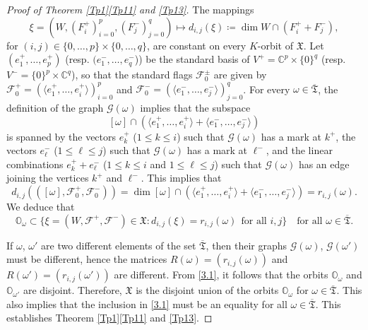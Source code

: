 \documentclass[11pt]{article}
\theoremstyle{definition}
\numberwithin{equation}{section}
\newcommand{\Span}[1]{\langle #1\rangle}
\newcommand{\flag}{\mathcal{F}}
\newcommand{\Xorbit}{\mathbb{O}}
\newcommand{\ppermutationsof}{\mathfrak{T}}
\newcommand{\parameters}{\overline{\ppermutationsof}}
\newcommand{\Xfv}{\mathfrak{X}}
\newcommand{\mC}{\mathbb{C}}
\begin{document}
\begin{proof}[Proof of Theorem \ref{Tp1}\ref{Tp11} and \ref{Tp13}]
The mappings
\[\xi=(W,(F^+_i)_{i=0}^p,(F^-_j)_{j=0}^q)\mapsto d_{i,j}(\xi)\coloneqq \dim W\cap (F_i^++F_j^-),\] for $(i,j)\in\{0,\ldots,p\}\times\{0,\ldots,q\}$, are constant on every $K$-orbit of $\Xfv$.
Let $(e_1^+,\ldots,e_p^+)$ (resp. $(e_1^-,\ldots,e_q^-$)) be the standard basis of $V^+=\mC^p\times\{0\}^q$ (resp. $V^-=\{0\}^p\times\mC^q$), so that the standard flags $\flag_0^\pm$ are given by $\flag_0^+=(\Span{e_1^+,\ldots,e_i^+})_{i=0}^p$ and $\flag_0^-=(\Span{e_1^-,\ldots,e_j^-})_{j=0}^q$.
For every $\omega\in\parameters$,
the definition of the graph $\mathcal{G}(\omega)$ implies that the subspace \[[\omega]\cap(\Span{e_1^+,\ldots,e_i^+}+\Span{e_1^-,\ldots,e_j^-})\]
is spanned by the vectors $e_k^+$ ($1\leq k\leq i$) such that $\mathcal{G}(\omega)$ has a mark at $k^+$, the vectors $e_\ell^-$ ($1\leq \ell\leq j$) such that $\mathcal{G}(\omega)$ has a mark at $\ell^-$, and the linear combinations $e_k^++e_\ell^-$ ($1\leq k\leq i$ and $1\leq \ell\leq j$) such that $\mathcal{G}(\omega)$ has an edge joining the vertices $k^+$ and $\ell^-$. This implies that
\[
d_{i,j}(([\omega],\flag_0^+,\flag_0^-))=\dim [\omega]\cap(\Span{e_1^+,\ldots,e_i^+}+\Span{e_1^-,\ldots,e_j^-})=r_{i,j}(\omega).
\]
We deduce that
\begin{equation}
\label{3.1}
\Xorbit_\omega\subset \{\xi=(W,\flag^+,\flag^-)\in\Xfv: d_{i,j}(\xi)=r_{i,j}(\omega)\ \ \mbox{for all $i,j$}\}\quad\mbox{for all $\omega\in\parameters$}.
\end{equation}

If $\omega$, $\omega'$ are two different elements of the set $\parameters$, then their graphs $\mathcal{G}(\omega)$, $\mathcal{G}(\omega')$ must be different, hence the matrices $R(\omega)=(r_{i,j}(\omega))$ and $R(\omega')=(r_{i,j}(\omega'))$ are different. From \eqref{3.1}, it follows that the orbits $\Xorbit_\omega$ and $\Xorbit_{\omega'}$ are disjoint.
Therefore, $\Xfv$ is the disjoint union of the orbits $\Xorbit_\omega$ for $\omega\in\parameters$. This also implies that the inclusion in \eqref{3.1} must be an equality for all $\omega\in\parameters$.
This establishes Theorem \ref{Tp1}\ref{Tp11} and \ref{Tp13}.
\end{proof}
\end{document}
